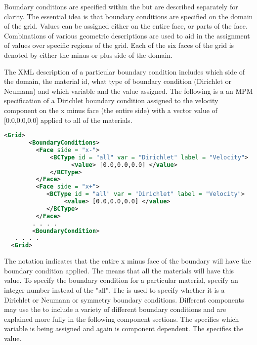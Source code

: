 Boundary conditions are specified within the 
but are described separately for clarity.  The essential idea is that
boundary conditions are specified on the domain of the grid.  Values
can be assigned either on the entire face, or parts of the face.
Combinations of various geometric descriptions are used to aid in the
assignment of values over specific regions of the grid.  Each of the
six faces of the grid is denoted by either the minus or plus side of
the domain.

The XML description of a particular boundary condition includes which
side of the domain, the material id, what type of boundary condition
(Dirichlet or Neumann) and which variable and the value assigned.  The
following is a an MPM specification of a Dirichlet boundary condition
assigned to the velocity component on the x minus face (the entire
side) with a vector value of [0.0,0.0,0.0] applied to all of the materials.

\begin{lstlisting}[language=XML]
 <Grid>
       <BoundaryConditions>
         <Face side = "x-">
             <BCType id = "all" var = "Dirichlet" label = "Velocity">
                   <value> [0.0,0.0,0.0] </value>
             </BCType>
         </Face>
         <Face side = "x+">
            <BCType id = "all" var = "Dirichlet" label = "Velocity">
                 <value> [0.0,0.0,0.0] </value>
            </BCType>
         </Face>
        . . . .
        <BoundaryCondition>
   . . . .
  <Grid>
\end{lstlisting}

The notation  indicates that the
entire x minus face of the boundary will have the boundary condition
applied.  The  means that all the
materials will have this value.  To specify the boundary condition for
a particular material, specify an integer number instead of the
"all".  The  is used to specify
whether it is a Dirichlet or Neumann or symmetry boundary conditions.
Different components may use the  to include a
variety of different boundary conditions and are explained more fully
in the following component sections.  The 
specifies which variable is being assigned and again is
component dependent.  The 
specifies the value.

